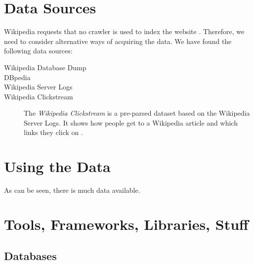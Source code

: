 \section{Data Sources}\label{sec:datasources}
Wikipedia requests that no crawler is used to index the website . Therefore, we need to consider alternative ways of acquiring the data. We have found the following data sources:
\begin{description}
  \item[Wikipedia Database Dump]
  \item[DBpedia]
  \item[Wikipedia Server Logs] 
  \item[Wikipedia Clickstream] The \emph{Wikipedia Clickstream} is a pre-parsed dataset based on the Wikipedia Server Logs. It shows how people get to a Wikipedia article and which links they click on \cite{wiki-clickstream}.
\end{description}

\section{Using the Data}

As can be seen, there is much data available. 

\section{Tools, Frameworks, Libraries, Stuff}\label{sec:selecting_tools}

\subsection{Databases}


